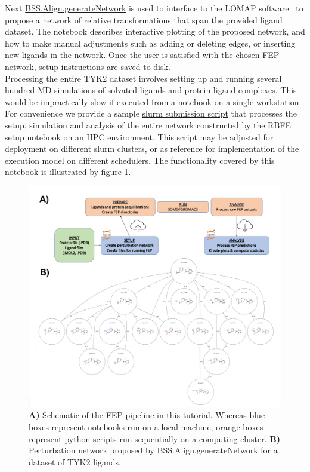 Next \href{https://biosimspace.openbiosim.org/api/generated/BioSimSpace.Align.generateNetwork.html}{BSS.Align.generateNetwork} is used to interface to the LOMAP software~\cite{Liu2013} to propose a network of relative transformations that span the provided ligand dataset. The notebook describes interactive plotting of the proposed network, and how to make manual adjustments such as adding or deleting edges, or inserting new ligands in the network. Once the user is satisfied with the chosen FEP network, setup instructions are saved to disk. 
\\
Processing the entire TYK2 dataset involves setting up and running several hundred MD simulations of solvated ligands and protein-ligand complexes. This would be impractically slow if executed from a notebook on a single workstation. For convenience we provide a sample \href{https://github.com/OpenBioSim/BioSimSpaceTutorials/blob/main/04_fep/02_RBFE/scripts/run_all_slurm.sh}{slurm submission script} that processes the setup, simulation and analysis of the entire network constructed by the RBFE setup notebook on an HPC environment. This script may be adjusted for deployment on different slurm clusters, or as reference for implementation of the execution model on different schedulers. The functionality covered by this notebook is illustrated by figure \ref{rbfe_setup_fig}.
\\

\begin{figure}[htp]
\includegraphics[width=\linewidth]{LIVECOMS/04_fep/rbfe-setup.png}
\caption{ \textbf{A)} Schematic of the FEP pipeline in this tutorial. Whereas blue boxes represent notebooks run on a local machine, orange boxes represent python scripts run sequentially on a computing cluster.
\textbf{B)} Perturbation network proposed by BSS.Align.generateNetwork for a dataset of TYK2 ligands.} 
\label{rbfe_setup_fig}
\end{figure}


